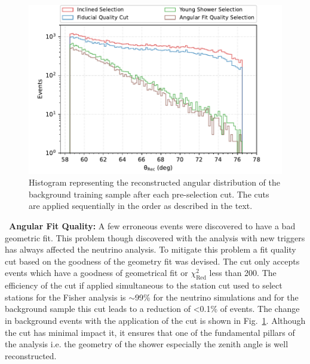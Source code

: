 \begin{description}
  \begin{figure}[t!]
    \centering
    \includegraphics[width=14.5cm]{thesis_figures/Nu_analysis/Selection_bkg_theta_wnt_redcut_2.pdf}
    \caption{Histogram representing the reconstructed angular distribution of the background training sample after each pre-selection cut. The cuts are applied sequentially in the order as described in the text.}
    \label{fig:Pre_cut_summary}
  \end{figure}

  \item ~\textbf{Angular Fit Quality:} A few erroneous events were discovered to have a bad geometric fit. This problem though discovered with the analysis with new triggers has always affected the neutrino analysis. To mitigate this problem a fit quality cut based on the goodness of the geometry fit was devised. The cut only accepts events which have a goodness of geometrical fit or $\chi^2_{\text{Red}}$ less than 200. The efficiency of the cut if applied simultaneous to the station cut used to select stations for the Fisher analysis is $\sim$99\% for the neutrino simulations and for the background sample this cut leads to a reduction of <0.1\% of events. The change in background events with the application of the cut is shown in Fig.~\ref{fig:Pre_cut_summary}. Although the cut has minimal impact it, it ensures that one of the fundamental pillars of the analysis i.e. the geometry of the shower especially the zenith angle is well reconstructed.
\end{description} 


